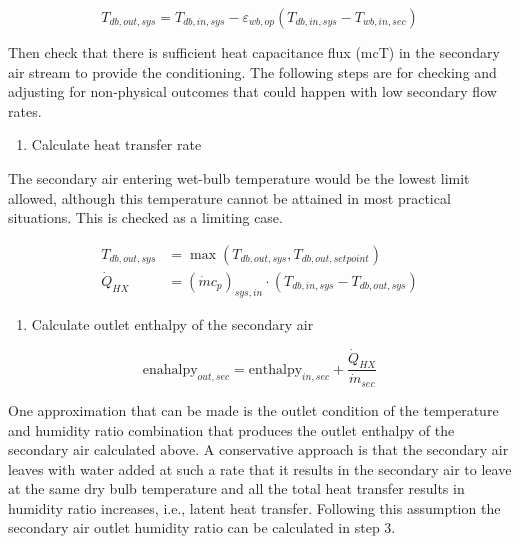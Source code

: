 \begin{equation}
T_{db,out,sys} = T_{db,in,sys} - \varepsilon_{wb,op} \left( T_{db,in,sys} - T_{wb,in,sec} \right)
\end{equation}

Then check that there is sufficient heat capacitance flux (mcT) in the secondary air stream to provide the conditioning. The following steps are for checking and adjusting for non-physical outcomes that could happen with low secondary flow rates.

\begin{enumerate}
\def\labelenumi{\arabic{enumi}.}
\tightlist
\item
  Calculate heat transfer rate
\end{enumerate}

The secondary air entering wet-bulb temperature would be the lowest limit allowed, although this temperature cannot be attained in most practical situations. This is checked as a limiting case.

\begin{equation}
  \begin{array}{rl}
    T_{db,out,sys} & = \max\left(T_{db,out,sys},T_{db,out,setpoint}\right) \\
    \dot{Q}_{HX} & = \left(\dot{m}c_p\right)_{sys,in} \cdot \left(T_{db,in,sys}-T_{db,out,sys}\right)
  \end{array}
\end{equation}

\begin{enumerate}
\def\labelenumi{\arabic{enumi}.}
\setcounter{enumi}{1}
\tightlist
\item
  Calculate outlet enthalpy of the secondary air
\end{enumerate}

\begin{equation}
\text{enahalpy}_{out,sec} = \text{enthalpy}_{in,sec} + \frac{\dot{Q}_{HX}}{\dot{m}_{sec}}
\end{equation}

One approximation that can be made is the outlet condition of the temperature and humidity ratio combination that produces the outlet enthalpy of the secondary air calculated above. A conservative approach is that the secondary air leaves with water added at such a rate that it results in the secondary air to leave at the same dry bulb temperature and all the total heat transfer results in humidity ratio increases, i.e., latent heat transfer. Following this assumption the secondary air outlet humidity ratio can be calculated in step 3.

